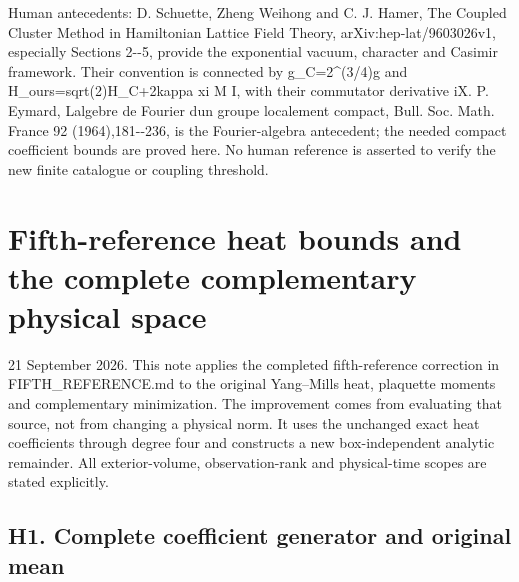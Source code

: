 \documentclass[11pt,a4paper]{article}
\let\originalsection\section
\renewcommand{\section}{\clearpage\originalsection}
\begin{document}
Human antecedents: D. Schuette, Zheng Weihong and C. J. Hamer, The
Coupled Cluster Method in Hamiltonian Lattice Field Theory,
{a\allowbreak{}r\allowbreak{}X\allowbreak{}i\allowbreak{}v\allowbreak{}:\allowbreak{}h\allowbreak{}e\allowbreak{}p\allowbreak{}-\allowbreak{}l\allowbreak{}a\allowbreak{}t\allowbreak{}/\allowbreak{}9\allowbreak{}6\allowbreak{}0\allowbreak{}3\allowbreak{}0\allowbreak{}2\allowbreak{}6\allowbreak{}v\allowbreak{}1\allowbreak{},\allowbreak{}}
especially Sections 2-\/-5, provide the exponential vacuum, character
and Casimir framework. Their convention is connected by g\_C=2\^{}(3/4)g
and
{H\allowbreak{}\_\allowbreak{}o\allowbreak{}u\allowbreak{}r\allowbreak{}s\allowbreak{}=\allowbreak{}s\allowbreak{}q\allowbreak{}r\allowbreak{}t\allowbreak{}(\allowbreak{}2\allowbreak{})\allowbreak{}H\allowbreak{}\_\allowbreak{}C\allowbreak{}+\allowbreak{}2\allowbreak{}k\allowbreak{}a\allowbreak{}p\allowbreak{}p\allowbreak{}a\allowbreak{}}
xi M I, with their commutator derivative iX. P. Eymard,
L\textquotesingle algebre de Fourier d\textquotesingle un groupe
localement compact, Bull. Soc. Math. France 92 (1964),181-\/-236, is the
Fourier-algebra antecedent; the needed compact coefficient bounds are
proved here. No human reference is asserted to verify the new finite
catalogue or coupling threshold.

\section{Fifth-reference heat bounds and the complete complementary
physical
space}\label{fifth-reference-heat-bounds-and-the-complete-complementary-physical-space}

21 September 2026. This note applies the completed fifth-reference
correction in
{F\allowbreak{}I\allowbreak{}F\allowbreak{}T\allowbreak{}H\allowbreak{}\_\allowbreak{}R\allowbreak{}E\allowbreak{}F\allowbreak{}E\allowbreak{}R\allowbreak{}E\allowbreak{}N\allowbreak{}C\allowbreak{}E\allowbreak{}.\allowbreak{}m\allowbreak{}d\allowbreak{}}
to the original Yang--Mills heat, plaquette moments and complementary
minimization. The improvement comes from evaluating that source, not
from changing a physical norm. It uses the unchanged exact heat
coefficients through degree four and constructs a new box-independent
analytic remainder. All exterior-volume, observation-rank and
physical-time scopes are stated explicitly.

\subsection{H1. Complete coefficient generator and original
mean}\label{h1.-complete-coefficient-generator-and-original-mean}
\end{document}
